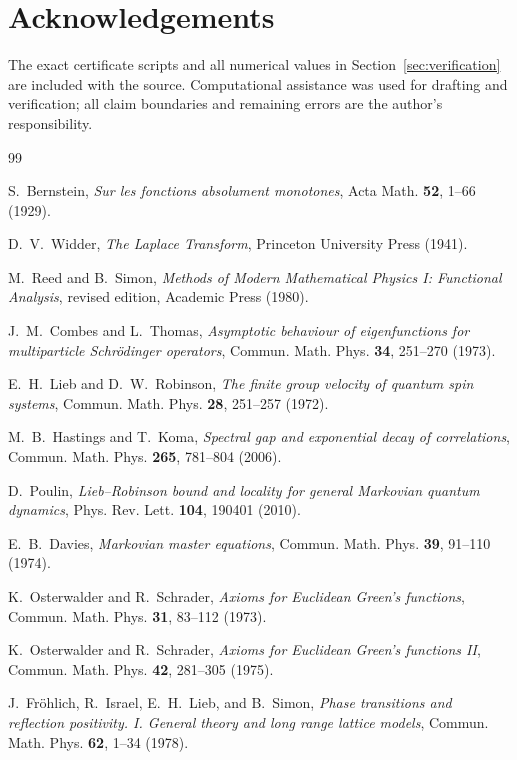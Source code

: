 \documentclass[11pt,a4paper]{article}
\theoremstyle{definition}
\theoremstyle{remark}
\begin{document}
\section*{Acknowledgements}
The exact certificate scripts and all numerical values in
Section~\ref{sec:verification} are included with the source.  Computational
assistance was used for drafting and verification; all claim boundaries and
remaining errors are the author's responsibility.

\begin{thebibliography}{99}

S.~Bernstein, \emph{Sur les fonctions absolument monotones}, Acta Math.
\textbf{52}, 1--66 (1929).

D.~V.~Widder, \emph{The Laplace Transform}, Princeton University Press (1941).

M.~Reed and B.~Simon, \emph{Methods of Modern Mathematical Physics I:
Functional Analysis}, revised edition, Academic Press (1980).

J.~M.~Combes and L.~Thomas, \emph{Asymptotic behaviour of eigenfunctions for
multiparticle Schr\"odinger operators}, Commun. Math. Phys. \textbf{34},
251--270 (1973).

E.~H.~Lieb and D.~W.~Robinson, \emph{The finite group velocity of quantum spin
systems}, Commun. Math. Phys. \textbf{28}, 251--257 (1972).

M.~B.~Hastings and T.~Koma, \emph{Spectral gap and exponential decay of
correlations}, Commun. Math. Phys. \textbf{265}, 781--804 (2006).

D.~Poulin, \emph{Lieb--Robinson bound and locality for general Markovian
quantum dynamics}, Phys. Rev. Lett. \textbf{104}, 190401 (2010).

E.~B.~Davies, \emph{Markovian master equations}, Commun. Math. Phys.
\textbf{39}, 91--110 (1974).

K.~Osterwalder and R.~Schrader, \emph{Axioms for Euclidean Green's functions},
Commun. Math. Phys. \textbf{31}, 83--112 (1973).

K.~Osterwalder and R.~Schrader, \emph{Axioms for Euclidean Green's functions
II}, Commun. Math. Phys. \textbf{42}, 281--305 (1975).

J.~Fr\"ohlich, R.~Israel, E.~H.~Lieb, and B.~Simon, \emph{Phase transitions
and reflection positivity. I. General theory and long range lattice models},
Commun. Math. Phys. \textbf{62}, 1--34 (1978).


\end{thebibliography}
\end{document}
